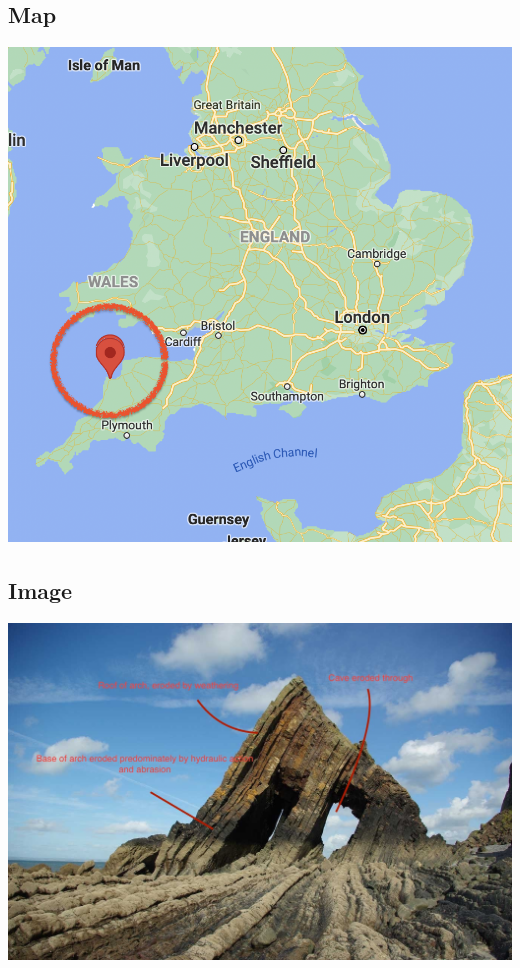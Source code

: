 \documentclass[11pt]{article}
\begin{document}
\subsection{Map}
\label{sec:org02db919}
\begin{center}
\includegraphics[width=.9\linewidth]{Images/black-church-rock.png}
\end{center}

\subsection{Image}
\label{sec:org9bc6478}
\begin{center}
\includegraphics[width=.9\linewidth]{Images/arch-image.jpg}
\end{center}
\end{document}
